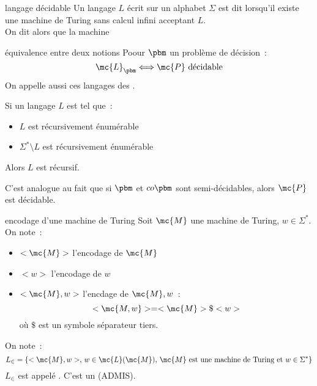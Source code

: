 \begin{definition}{}{langage décidable}
    Un langage $L$ écrit sur un alphabet $\Sigma$ est dit  lorsqu'il existe une machine de Turing sans calcul infini acceptant $L$.\\
    On dit alors que la machine 
\end{definition}

\begin{proposition}{}{équivalence entre deux notions}
    Poour $\pbm$ un problème de décision~:
    $$\mc{L}_\pbm \Longleftrightarrow \mc{P} \text{ décidable}$$
    On appelle aussi ces langages des .
\end{proposition}

\begin{proposition}{}{}
    Si un langage $L$ est tel que~:
    \begin{itemize}
        \item $L$ est récursivement énumérable
        \item $\Sigma^* \setminus L$ est récursivement énumérable
    \end{itemize}
    Alors $L$ est récursif.
\end{proposition}

\begin{remarque}{}{}
    C'est analogue au fait que si $\pbm$ et $co\pbm$ sont semi-décidables, alors $\mc{P}$ est décidable.
\end{remarque}

\begin{definition}{}{encodage d'une machine de Turing}
    Soit $\mc{M}$ une machine de Turing, $w \in \Sigma^*$. On note~:
    \begin{itemize}
        \item $<\mc{M}>$ l'encodage de $\mc{M}$
        \item $<w>$ l'encodage de $w$
        \item $<\mc{M}, w>$ l'encdage de $\mc{M}, w$~:
        $$<\mc{M, w}> = <\mc{M}>\$<w>$$
        où $\$$ est un symbole séparateur tiers.
    \end{itemize}
    On note~:
    $$L_\in = \{<\mc{M},w>,\, w \in \mc{L}(\mc{M}),\, \mc{M} \text{ est une machine de Turing et }  w \in \Sigma^*\}$$
    $L_\in$ est appelé . C'est un  (ADMIS).\\\\
\end{definition}

